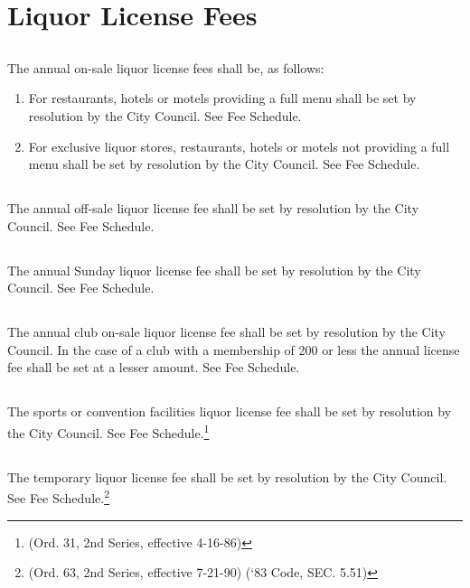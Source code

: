 \section{Liquor License Fees}
\subsection{}
The annual on-sale liquor license fees shall be, as follows:
\begin{enumerate}[{\indent}1)]
    \item For restaurants, hotels or motels providing a full menu shall be set by resolution by the City Council. See Fee Schedule.
    \item For exclusive liquor stores, restaurants, hotels or motels not providing a full menu shall be set by resolution by the City Council. See Fee Schedule.
\end{enumerate}
\subsection{}
The annual off-sale liquor license fee shall be set by resolution by the City Council. See Fee Schedule.
\subsection{}
The annual Sunday liquor license fee shall be set by resolution by the City Council. See Fee Schedule.
\subsection{}
The annual club on-sale liquor license fee shall be set by resolution by the City Council. In the case of a club with a membership of 200 or less the annual license fee shall be set at a lesser amount. See Fee Schedule.
\subsection{}
The sports or convention facilities liquor license fee shall be set by resolution by the City Council. See Fee Schedule.\footnote{(Ord. 31, 2nd Series, effective 4-16-86)}
\subsection{}
The temporary liquor license fee shall be set by resolution by the City Council. See Fee Schedule.\footnote{(Ord. 63, 2nd Series, effective 7-21-90) (‘83 Code, SEC. 5.51)}

